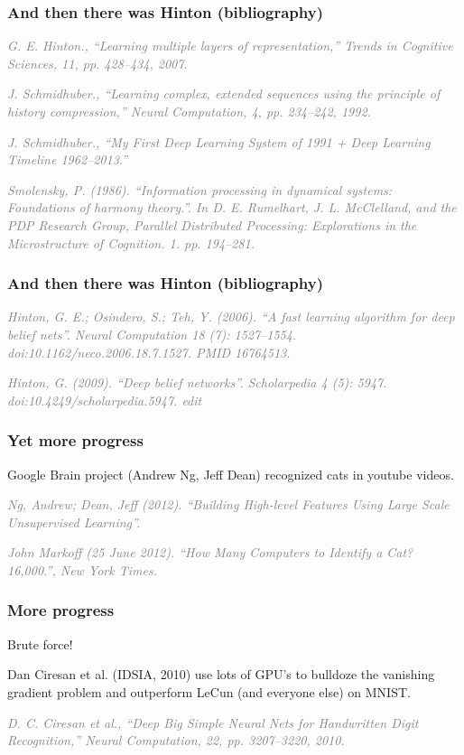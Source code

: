 \documentclass[t]{beamer}
\newcommand\smallgray[1]{\textcolor{gray}{\small\it #1}}
\newcommand\prevwork[1]{\smallgray{#1}}
\begin{document}
\begin{frame}
  \frametitle{And then there was Hinton (bibliography)}

\prevwork{G. E. Hinton., ``Learning multiple layers of
  representation,'' Trends in Cognitive Sciences, 11, pp. 428–434,
  2007.}

\prevwork{J. Schmidhuber., ``Learning complex, extended sequences using
  the principle of history compression,'' Neural Computation, 4,
  pp. 234–242, 1992.}

\prevwork{J. Schmidhuber., ``My First Deep Learning System of 1991 +
  Deep Learning Timeline 1962–2013.''}

\prevwork{Smolensky, P. (1986). ``Information processing in dynamical
  systems: Foundations of harmony theory.''. In D. E. Rumelhart,
  J. L. McClelland, and the PDP Research Group, Parallel Distributed
  Processing: Explorations in the Microstructure of
  Cognition. 1. pp. 194–281.}
\end{frame}

\begin{frame}
  \frametitle{And then there was Hinton (bibliography)}

\prevwork{Hinton, G. E.; Osindero, S.; Teh, Y. (2006). ``A fast
  learning algorithm for deep belief nets''. Neural Computation 18 (7):
  1527–1554. doi:10.1162/neco.2006.18.7.1527. PMID 16764513.}

\prevwork{Hinton, G. (2009). ``Deep belief networks''. Scholarpedia 4
  (5): 5947. doi:10.4249/scholarpedia.5947. edit}
\end{frame}

\begin{frame}
  \frametitle{Yet more progress}

  Google Brain project (Andrew Ng, Jeff Dean) recognized cats in
  youtube videos.

  \prevwork{Ng, Andrew; Dean, Jeff (2012). ``Building High-level
    Features Using Large Scale Unsupervised Learning''.}

  \prevwork{John Markoff (25 June 2012). ``How Many Computers to
    Identify a Cat? 16,000.'', New York Times.}

\end{frame}

\begin{frame}
  \frametitle{More progress}
  Brute force!

  Dan Ciresan et al. (IDSIA, 2010) use lots of GPU's to
  bulldoze the vanishing gradient problem and outperform LeCun (and
  everyone else) on MNIST.

  \prevwork{D. C. Ciresan et al., ``Deep Big Simple Neural Nets for
    Handwritten Digit Recognition,'' Neural Computation, 22,
    pp. 3207–3220, 2010.}
\end{frame}
\end{document}
